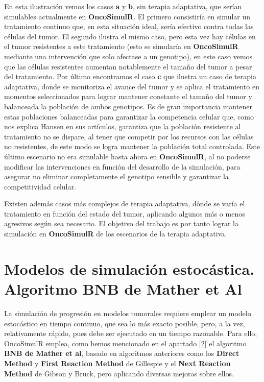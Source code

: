 En esta ilustración vemos los casos \textbf{a} y \textbf{b}, sin terapia adaptativa, que serían simulables actualmente en \textbf{OncoSimulR}. El primero consistiría en simular un tratamiento continuo que, en esta situación ideal, sería efectivo contra todas las células del tumor. El segundo ilustra el mismo caso, pero esta vez hay células en el tumor resistentes a este tratamiento (esto se simularía en \textbf{OncoSimulR} mediante una intervención que solo afectase a un genotipo), en este caso vemos que las células resistentes aumentan notablemente el tamaño del tumor a pesar del tratamiento. Por último encontramos el caso \textbf{c} que ilustra un caso de terapia adaptativa, donde se monitoriza el avance del tumor y se aplica el tratamiento en momentos seleccionados para lograr mantener constante el tamaño del tumor y balanceada la población de ambos genotipos. Es de gran importancia mantener estas poblaciones balanceadas para garantizar la competencia celular que, como nos explica Hansen\cite{Hansen1}\cite{Hansen2} en sus artículos, garantiza que la población resistente al tratamiento no se dispare, al tener que competir por los recursos con las células no resistentes, de este modo se logra mantener la población total controlada.
Este último escenario no era simulable hasta ahora en \textbf{OncoSimulR}, al no poderse modificar las intervenciones en función del desarrollo de la simulación, para asegurar no eliminar completamente el genotipo sensible y garantizar la competitividad celular.

Existen además casos más complejos de terapia adaptativa, dónde se varía el tratamiento en función del estado del tumor, aplicando algunos más o menos agresivos según sea necesario. El objetivo del trabajo es por tanto lograr la simulación en \textbf{OncoSimulR} de los escenarios de la terapia adaptativa.


 
\section{Modelos de simulación estocástica. Algoritmo BNB de Mather et Al}\label{2.1}

La simulación de progresión en modelos tumorales requiere emplear un modelo estocástico en tiempo continuo, que sea lo más exacto posible, pero, a la vez, relativamente rápido, pues debe ser ejecutado en un tiempo razonable.
Para ello, OncoSimulR\cite{OncoSimulR} emplea, como hemos mencionado en el apartado \ref{2} el algoritmo \textbf{BNB de Mather et al}\cite{Mather}, basado en algoritmos anteriores como los \textbf{Direct Method} y \textbf{First Reaction Method} de Gillespie\cite{Gillespie} y el \textbf{Next Reaction Method} de Gibson y Bruck\cite{Gibson}, pero aplicando diversas mejoras sobre ellos.

